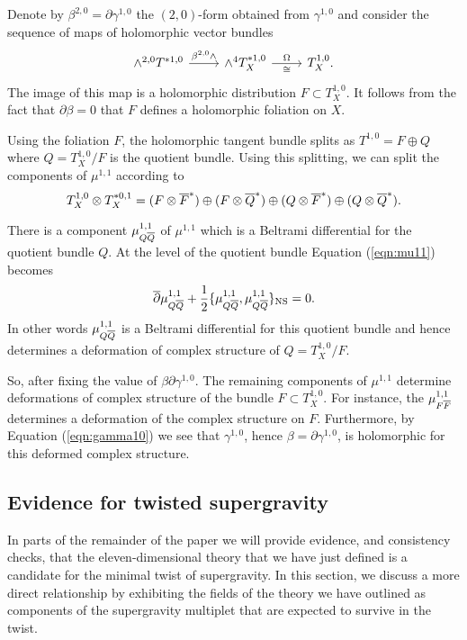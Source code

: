 \documentclass[11pt]{amsart}
\begin{document}
Denote by $\beta^{2,0} = \partial \gamma^{1,0}$ the $(2,0)$-form obtained from $\gamma^{1,0}$ and consider the sequence of maps of holomorphic vector bundles
\[
  \begin{tikzcd}
    \wedge^{2,0} T^{*1,0} \ar[r, "\beta^{2,0} \wedge"] & \wedge^4 T_X^{*1,0} \ar[r, "\Omega", "\cong"'] & T^{1,0}_X .
  \end{tikzcd}
\]
The image of this map is a holomorphic distribution $F \subset T_X^{1,0}$.
It follows from the fact that $\partial \beta = 0$ that $F$ defines a holomorphic foliation on $X$.

Using the foliation $F$, the holomorphic tangent bundle splits as $T^{1,0} = F \oplus Q$ where $Q = T^{1,0}_X / F$ is the quotient bundle.
Using this splitting, we can split the components of $\mu^{1,1}$ according to
\[
  T^{1,0}_X \otimes T^{*0,1}_X = (F \otimes\Bar{F}^*) \oplus (F \otimes \Bar{Q}^*) \oplus (Q \otimes \Bar{F}^*) \oplus (Q \otimes \Bar{Q}^*) .
\]

There is a component $\mu_{Q\Bar{Q}}^{1,1}$ of $\mu^{1,1}$ which is a Beltrami differential for the quotient bundle $Q$.
At the level of the quotient bundle Equation (\ref{eqn:mu11}) becomes
\[
  \dbar \mu^{1,1}_{Q \Bar{Q}} + \frac12 \{\mu^{1,1}_{Q \Bar{Q}} , \mu^{1,1}_{Q \Bar{Q}}\}_{\rm NS} = 0 .
\]
In other words $\mu^{1,1}_{Q \Bar{Q}}$ is a Beltrami differential for this quotient bundle and hence determines a deformation of complex structure of $Q = T^{1,0}_X / F$.

So, after fixing the value of $\beta \partial \gamma^{1,0}$.
The remaining components of $\mu^{1,1}$ determine deformations of complex structure of the bundle $F \subset T^{1,0}_X$.
For instance, the $\mu^{1,1}_{F \Bar{F}}$ determines a deformation of the complex structure on $F$.
Furthermore, by Equation (\ref{eqn:gamma10}) we see that $\gamma^{1,0}$, hence $\beta = \partial \gamma^{1,0}$, is holomorphic for this deformed complex structure.


\subsection{Evidence for twisted supergravity}\label{sec:evidence}


In parts of the remainder of the paper we will provide evidence, and consistency checks, that the eleven-dimensional theory that we have just defined is a candidate for the minimal twist of supergravity.
In this section, we discuss a more direct relationship by exhibiting the fields of the theory we have outlined as components of the supergravity multiplet that are expected to survive in the twist.
\end{document}
